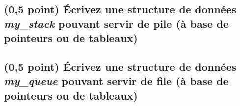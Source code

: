 \documentclass[11pt,a4paper]{article}
\begin{document}
\begin{center}
\begin{table}[ht!]
  \begin{minipage}{0.48\textwidth}

\subsection{(0,5 point) \'Ecrivez une structure de données \og \textit{my\_stack} \fg{} pouvant servir de pile (à base de pointeurs ou de tableaux) }

\medskip

\begin{center}
\end{center}

  \end{minipage}
  \hfillx
  \begin{minipage}{0.48\textwidth}

\subsection{(0,5 point) \'Ecrivez une structure de données \og \textit{my\_queue} \fg{} pouvant servir de file (à base de pointeurs ou de tableaux) }

\medskip

\begin{center}
\end{center}

  \end{minipage}
\end{table}
\end{center}


\vspace*{-0.5cm}


\end{document}
